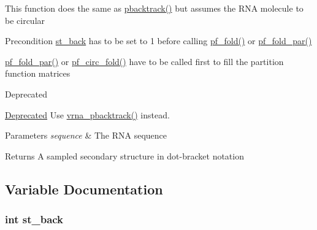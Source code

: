 This function does the same as \hyperlink{group__subopt__stochbt_gac03ca6db186bb3bf0a2a326d7fb3ba03}{pbacktrack()} but assumes the R\-N\-A molecule to be circular

\begin{DoxyPrecond}{Precondition}
\hyperlink{group__subopt__stochbt_gacd79b1a570e6ad9be24cb11fe8cae30a}{st\-\_\-back} has to be set to 1 before calling \hyperlink{group__pf__fold_gadc3db3d98742427e7001a7fd36ef28c2}{pf\-\_\-fold()} or \hyperlink{group__pf__fold_gac4f95bee734b2563a3d6e9932117ebdf}{pf\-\_\-fold\-\_\-par()} 

\hyperlink{group__pf__fold_gac4f95bee734b2563a3d6e9932117ebdf}{pf\-\_\-fold\-\_\-par()} or \hyperlink{group__pf__fold_ga819ce5fca8984004ac81c4a3b04cb735}{pf\-\_\-circ\-\_\-fold()} have to be called first to fill the partition function matrices
\end{DoxyPrecond}
\begin{DoxyRefDesc}{Deprecated}
\item[\hyperlink{deprecated__deprecated000096}{Deprecated}]Use \hyperlink{group__subopt__stochbt_ga0429de82e75af6c6e7508f4d273a192f}{vrna\-\_\-pbacktrack()} instead.\end{DoxyRefDesc}



\begin{DoxyParams}{Parameters}
{\em sequence} & The R\-N\-A sequence \\
\hline
\end{DoxyParams}
\begin{DoxyReturn}{Returns}
A sampled secondary structure in dot-\/bracket notation 
\end{DoxyReturn}


\subsection{Variable Documentation}
\hypertarget{group__subopt__stochbt_gacd79b1a570e6ad9be24cb11fe8cae30a}{
\subsubsection[{st\-\_\-back}]{\setlength{\rightskip}{0pt plus 5cm}int st\-\_\-back}}\label{group__subopt__stochbt_gacd79b1a570e6ad9be24cb11fe8cae30a}


